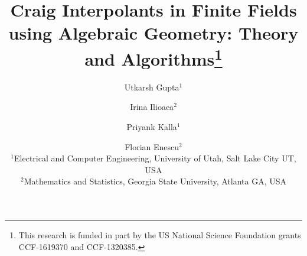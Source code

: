 \documentclass{llncs}
\theoremstyle{definition}
\numberwithin{Definition}{section}
\numberwithin{Example}{section}
\numberwithin{Lemma}{section}
\numberwithin{Theorem}{section}
\begin{document}
\title{Craig Interpolants in Finite Fields using Algebraic Geometry:
  Theory and Algorithms\thanks{This research is funded in part by the
    US National Science Foundation grants CCF-1619370 and
    CCF-1320385.}} 

\author{Utkarsh Gupta$^1$ \and Irina Ilioaea$^2$ \and Priyank Kalla$^1$ \and Florian Enescu$^2$\\
$^1$Electrical and Computer Engineering, University of Utah, Salt Lake City UT, USA \\
$^2$Mathematics and Statistics, Georgia State University, Atlanta GA, USA
}

\institute{}
\maketitle

\thispagestyle{plain}
\pagestyle{plain}











%

%

% 

% 
\newpage

\end{document}
